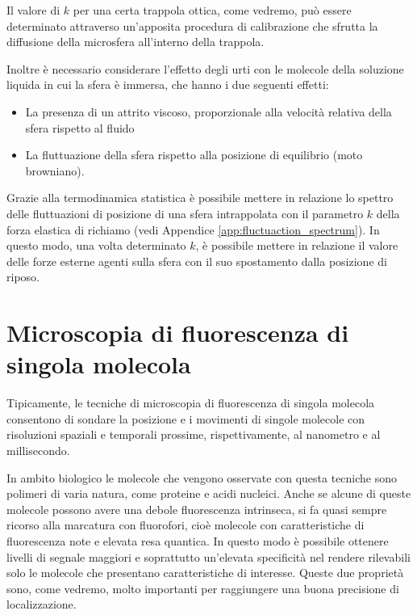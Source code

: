 Il valore di $k$ per una certa trappola ottica, come vedremo, può
essere determinato attraverso un'apposita procedura di calibrazione
che sfrutta la diffusione della microsfera all'interno della trappola.

Inoltre è necessario considerare l'effetto degli urti con le molecole
della soluzione liquida in cui la sfera è immersa, che hanno i due
seguenti effetti:
\begin{itemize}
    \item La presenza di un attrito viscoso, proporzionale alla
        velocità relativa della sfera rispetto al fluido
    \item La fluttuazione della sfera rispetto alla posizione di
        equilibrio (moto browniano).
\end{itemize}

Grazie alla termodinamica statistica è possibile mettere in relazione
lo spettro delle fluttuazioni di posizione di una sfera intrappolata
con il parametro $k$ della forza elastica di richiamo
(vedi Appendice \ref{app:fluctuaction_spectrum}).
In questo modo, una volta determinato $k$, è possibile mettere
in relazione il valore delle forze esterne agenti sulla sfera con il
suo spostamento dalla posizione di riposo.


\section{Microscopia di fluorescenza di singola molecola}
\label{sec:fluo}

Tipicamente, le tecniche di microscopia di fluorescenza di singola
molecola consentono di sondare la posizione e i movimenti di singole
molecole con risoluzioni spaziali e temporali prossime,
rispettivamente, al nanometro e al millisecondo.

In ambito biologico le molecole che vengono osservate con questa
tecniche sono polimeri di varia natura, come proteine e acidi
nucleici. Anche se alcune di queste molecole possono avere una
debole fluorescenza intrinseca, si fa quasi sempre ricorso alla
marcatura con fluorofori, cioè molecole con caratteristiche di
fluorescenza note e elevata resa quantica. In questo modo è
possibile ottenere livelli di segnale maggiori e soprattutto 
un'elevata specificità nel rendere rilevabili solo le molecole
che presentano caratteristiche di interesse.
Queste due proprietà sono, come vedremo, molto importanti per
raggiungere una buona precisione di localizzazione.

